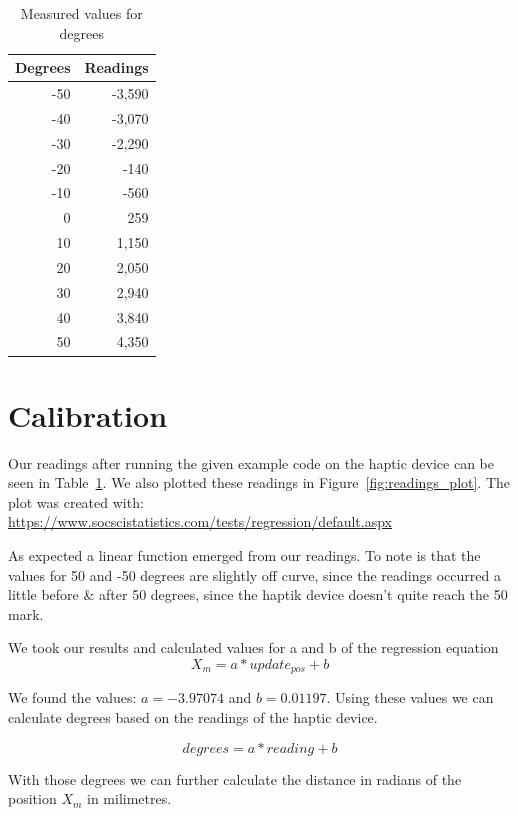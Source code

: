 \documentclass[12pt, a4paper]{article}
\begin{document}
\begin{table}[t]
\centering
\begin{tabular}{|r|r|}
\hline
Degrees & Readings \\ \hline
-50 & -3,590 \\ \hline
-40 & -3,070 \\ \hline
-30 & -2,290 \\ \hline
-20 & -140 \\ \hline
-10 & -560 \\ \hline
0 & 259 \\ \hline
10 & 1,150 \\ \hline
20 & 2,050 \\ \hline
30 & 2,940 \\ \hline
40 & 3,840 \\ \hline
50 & 4,350 \\ \hline
\end{tabular}
\caption{Measured values for degrees}
\label{table:readings}
\end{table}

\section{Calibration} \label{sec:cal}
Our readings after running the given example code on the haptic device can be seen in Table~\ref{table:readings}. We also plotted these readings in Figure~\ref{fig:readings_plot}. The plot was created with: \\
\url{https://www.socscistatistics.com/tests/regression/default.aspx}

As expected a linear function emerged from our readings. To note is that the values for 50 and -50 degrees are slightly off curve, since the readings occurred a little before \& after 50 degrees, since the haptik device doesn’t quite reach the 50 mark.

We took our results and calculated values for a and b of the regression equation
\begin{equation*}
X_m = a * update_{pos} + b
\end{equation*}

We found the values: $a = -3.97074$ and $b = 0.01197$. Using these values we can calculate degrees based on the readings of the haptic device.

\begin{equation*}
degrees = a * reading + b
\end{equation*}

With those degrees we can further calculate the distance in radians of the position $X_m$ in milimetres.
\end{document}
